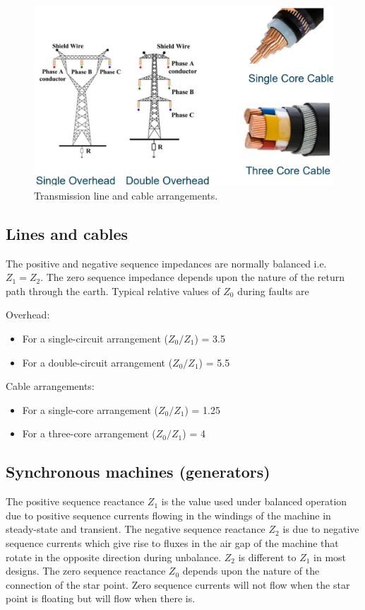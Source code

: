 \documentclass[class=report, crop=false, 12pt,a4paper]{standalone}
\begin{document}
\begin{figure}[H]
	\centering
	\includegraphics[width = \textwidth]{../img/figure33.png}
	\caption{Transmission line and cable arrangements.}
\end{figure}
\subsection{Lines and cables}
The positive and negative sequence impedances are normally balanced i.e. $Z_1 = Z_2$. The zero sequence impedance depends upon the nature of the return path through the earth. Typical relative values of $Z_0$ during faults are

Overhead:
\begin{itemize}
	\item For a single-circuit arrangement ($Z_0/Z_1$) = 3.5
	\item For a double-circuit arrangement ($Z_0/Z_1$) = 5.5
\end{itemize}
Cable arrangements:
\begin{itemize}
	\item For a single-core arrangement ($Z_0/Z_1$) = 1.25
	\item For a three-core arrangement ($Z_0/Z_1$) = 4
\end{itemize}
\subsection{Synchronous machines (generators)}
The positive sequence reactance $Z_1$ is the value used under balanced operation due to positive sequence currents flowing in the windings of the machine in steady-state and transient. The negative sequence reactance $Z_2$ is due to negative sequence currents which give rise to fluxes in the air gap of the machine that rotate in the opposite direction during unbalance. $Z_2$ is different to $Z_1$ in most designs. The zero sequence reactance $Z_0$ depends upon the nature of the connection of the star point. Zero sequence currents will not flow when the star point is floating but will flow when there is.
\end{document}

